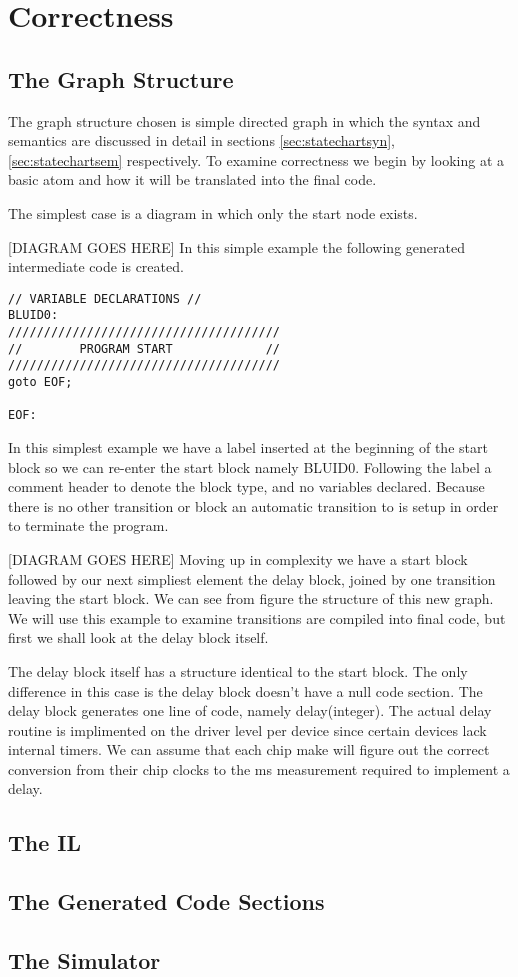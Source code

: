 \section{Correctness}
\subsection{The Graph Structure}
The graph structure chosen is simple directed graph in which the syntax and semantics are discussed in detail in sections \ref{sec:statechartsyn}, \ref{sec:statechartsem} respectively. To examine correctness we begin by looking at a basic atom and how it will be translated into the final code.

The simplest case is a diagram in which only the start node exists.

[DIAGRAM GOES HERE]
In this simple example the following generated intermediate code  is created.

\begin{lstlisting}
// VARIABLE DECLARATIONS //
BLUID0:
//////////////////////////////////////
//        PROGRAM START             //
//////////////////////////////////////
goto EOF;

EOF:
\end{lstlisting}

In this simplest example we have a label inserted at the beginning of the start block so we can re-enter the start block namely BLUID0. Following the label a comment header to denote the block type, and no variables declared.  Because there is no other transition or block an automatic transition to  is setup in order to terminate the program.

[DIAGRAM GOES HERE]
Moving up in complexity we have a start block followed by our next simpliest element the delay block, joined by one transition leaving the start block. We can see from figure %
the structure of this new graph. We will use this example to examine transitions are compiled into final code, but first we shall look at the delay block itself.

The delay block itself has a structure identical to the start block. The only difference in this case is the delay block doesn't have a null code section. The delay block generates one line of code, namely delay(integer). The actual delay routine is implimented on the driver level per device since certain devices lack internal timers. We can assume that each chip make will figure out the correct conversion from their chip clocks to the ms measurement required to implement a delay.


\subsection{The IL}
\subsection{The Generated Code Sections}
\subsection{The Simulator}